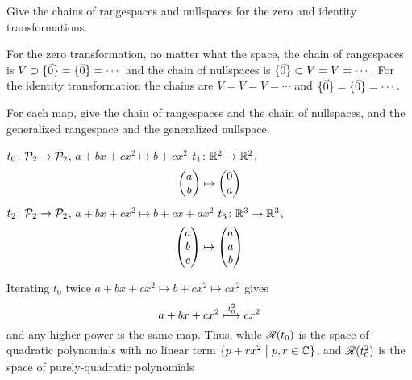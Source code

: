 \begin{exercises}
  \item 
    Give the chains of rangespaces and nullspaces for the zero and
    identity transformations.
    \begin{answer}
      For the zero transformation,
      no matter what the space, the chain of rangespaces 
      is \( V\supset\mbox{$\{\vec{0}\}$}=\mbox{$\{\vec{0}\}$}=\cdots\, \)
      and the chain of nullspaces is \( \mbox{$\{\vec{0}\}$}\subset V=V=\cdots\, \).
      For the identity transformation the chains are
      \( V=V=V=\cdots \) and
      \( \mbox{$\{\vec{0}\}$}=\mbox{$\{\vec{0}\}$}=\cdots\, \). 
    \end{answer}
  \item 
     For each map, 
     give the chain of rangespaces and the chain of nullspaces,
     and the generalized rangespace and the 
     generalized nullspace.
     \begin{exparts}
       \partsitem $\mbox{$t_0\colon \mathcal{P}_2\to \mathcal{P}_2$}$, 
         $a+bx+cx^2\mapsto b+cx^2$ 
       \partsitem $\mbox{$t_1\colon \mathbb{R}^2\to \mathbb{R}^2$}$,
         \begin{equation*}
           \begin{pmatrix} a \\ b \end{pmatrix}\mapsto\begin{pmatrix} 0 \\ a \end{pmatrix}
         \end{equation*}
       \partsitem $\mbox{$t_2\colon \mathcal{P}_2\to \mathcal{P}_2$}$, 
         $a+bx+cx^2\mapsto b+cx+ax^2$
       \partsitem $\mbox{$t_3\colon \mathbb{R}^3\to \mathbb{R}^3$}$,
         \begin{equation*}
           \begin{pmatrix} a \\ b \\ c \end{pmatrix}\mapsto\begin{pmatrix} a \\ a \\ b \end{pmatrix}
         \end{equation*}
     \end{exparts}
     \begin{answer}
       \begin{exparts}
         \partsitem Iterating $t_0$ twice  
           $a+bx+cx^2\mapsto b+cx^2\mapsto cx^2$
           gives 
           \begin{equation*}
             a+bx+cx^2\stackrel{t_0^2}{\longmapsto}cx^2
           \end{equation*}
           and any higher power is the same map.
           Thus, while $\mathscr{R}(t_0)$ is the space of 
           quadratic polynomials
           with no linear term $\mbox{$\{p+rx^2\bigm| p,r\in \mathbb{C}\}$}$,
           and
           $\mathscr{R}(t_0^2)$ is the space of purely-quadratic polynomials

\end{exparts}
\end{answer}
\end{exercises}
